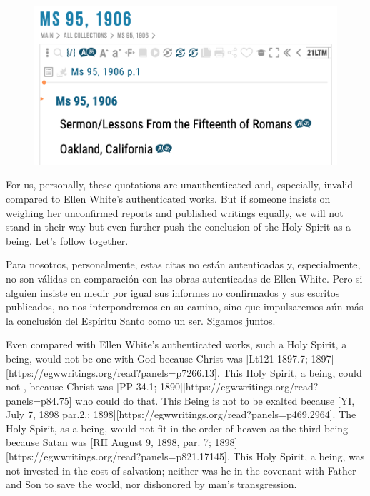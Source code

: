 \begin{figure}
    \centering
    \includegraphics[width=1\linewidth]{images/sermons-and-talks.png}
    \label{fig:enter-label}
\end{figure}


For us, personally, these quotations are unauthenticated and, especially, invalid compared to Ellen White’s authenticated works. But if someone insists on weighing her unconfirmed reports and published writings equally, we will not stand in their way but even further push the conclusion of the Holy Spirit as a being. Let’s follow together.


Para nosotros, personalmente, estas citas no están autenticadas y, especialmente, no son válidas en comparación con las obras autenticadas de Ellen White. Pero si alguien insiste en medir por igual sus informes no confirmados y sus escritos publicados, no nos interpondremos en su camino, sino que impulsaremos aún más la conclusión del Espíritu Santo como un ser. Sigamos juntos.


Even compared with Ellen White’s authenticated works, such a Holy Spirit, a being, would not be one with God because Christ was [Lt121-1897.7; 1897][https://egwwritings.org/read?panels=p7266.13]. This Holy Spirit, a being, could not , because Christ was [PP 34.1; 1890][https://egwwritings.org/read?panels=p84.75] who could do that. This Being is not to be exalted because [YI, July 7, 1898 par.2.; 1898][https://egwwritings.org/read?panels=p469.2964]. The Holy Spirit, as a being, would not fit in the order of heaven as the third being because Satan was [RH August 9, 1898, par. 7; 1898][https://egwwritings.org/read?panels=p821.17145]. This Holy Spirit, a being, was not invested in the cost of salvation; neither was he in the covenant with Father and Son to save the world, nor dishonored by man’s transgression.


